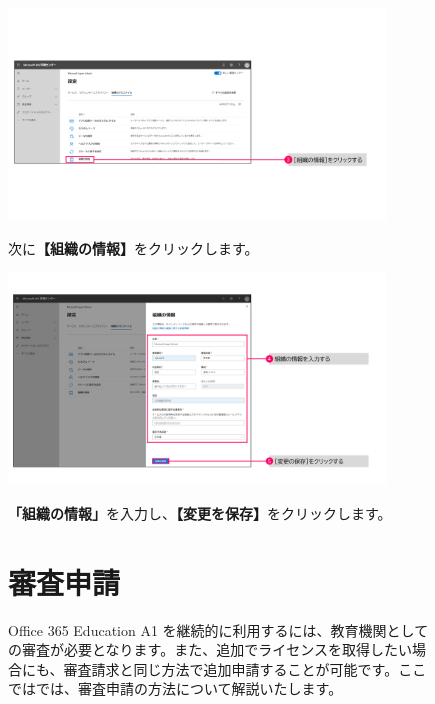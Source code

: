 \begin{figure}[h]
    \begin{minipage}{0.6\textwidth}
        \includegraphics[width=10cm]{figures/O365A1_profile02.png}
    \end{minipage}
    \begin{minipage}{0.4\textwidth}
       次に\textbf{【組織の情報】}をクリックします。
    \end{minipage}
\end{figure}

\begin{figure}[h]
    \begin{minipage}{0.6\textwidth}
        \includegraphics[width=10cm]{figures/O365A1_profile03.png}
    \end{minipage}
    \begin{minipage}{0.4\textwidth}
       \textbf{「組織の情報」}を入力し、\textbf{【変更を保存】}をクリックします。
    \end{minipage}
\end{figure}

\begin{figure}[h]
    \begin{minipage}{1.0\textwidth}
        \section{審査申請}
        \label{sec:審査申請}
        Office 365 Education A1 を継続的に利用するには、教育機関としての審査が必要となります。また、追加でライセンスを取得したい場合にも、審査請求と同じ方法で追加申請することが可能です。ここではでは、審査申請の方法について解説いたします。
    \end{minipage}
\end{figure}

